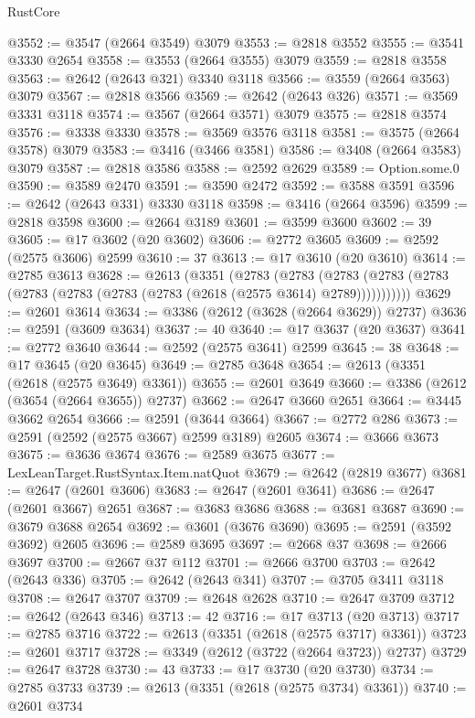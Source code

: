 \begin{lexlean}{RustCore}
\begin{coremodule}
@3552 := @3547 (@2664 @3549) @3079
@3553 := @2818 @3552
@3555 := @3541 @3330 @2654
@3558 := @3553 (@2664 @3555) @3079
@3559 := @2818 @3558
@3563 := @2642 (@2643 @321) @3340 @3118
@3566 := @3559 (@2664 @3563) @3079
@3567 := @2818 @3566
@3569 := @2642 (@2643 @326)
@3571 := @3569 @3331 @3118
@3574 := @3567 (@2664 @3571) @3079
@3575 := @2818 @3574
@3576 := @3338 @3330
@3578 := @3569 @3576 @3118
@3581 := @3575 (@2664 @3578) @3079
@3583 := @3416 (@3466 @3581)
@3586 := @3408 (@2664 @3583) @3079
@3587 := @2818 @3586
@3588 := @2592 @2629
@3589 := Option.some.{0}
@3590 := @3589 @2470
@3591 := @3590 @2472
@3592 := @3588 @3591
@3596 := @2642 (@2643 @331) @3330 @3118
@3598 := @3416 (@2664 @3596)
@3599 := @2818 @3598
@3600 := @2664 @3189
@3601 := @3599 @3600
@3602 := 39
@3605 := @17 @3602 (@20 @3602)
@3606 := @2772 @3605
@3609 := @2592 (@2575 @3606) @2599
@3610 := 37
@3613 := @17 @3610 (@20 @3610)
@3614 := @2785 @3613
@3628 := @2613
    (@3351
      (@2783
        (@2783
          (@2783 (@2783 (@2783 (@2783 (@2783 (@2783 (@2783 (@2618 (@2575 @3614) @2789)))))))))))
@3629 := @2601 @3614
@3634 := @3386 (@2612 (@3628 (@2664 @3629)) @2737)
@3636 := @2591 (@3609 @3634)
@3637 := 40
@3640 := @17 @3637 (@20 @3637)
@3641 := @2772 @3640
@3644 := @2592 (@2575 @3641) @2599
@3645 := 38
@3648 := @17 @3645 (@20 @3645)
@3649 := @2785 @3648
@3654 := @2613 (@3351 (@2618 (@2575 @3649) @3361))
@3655 := @2601 @3649
@3660 := @3386 (@2612 (@3654 (@2664 @3655)) @2737)
@3662 := @2647 @3660 @2651
@3664 := @3445 @3662 @2654
@3666 := @2591 (@3644 @3664)
@3667 := @2772 @286
@3673 := @2591 (@2592 (@2575 @3667) @2599 @3189) @2605
@3674 := @3666 @3673
@3675 := @3636 @3674
@3676 := @2589 @3675
@3677 := LexLeanTarget.RustSyntax.Item.natQuot
@3679 := @2642 (@2819 @3677)
@3681 := @2647 (@2601 @3606)
@3683 := @2647 (@2601 @3641)
@3686 := @2647 (@2601 @3667) @2651
@3687 := @3683 @3686
@3688 := @3681 @3687
@3690 := @3679 @3688 @2654
@3692 := @3601 (@3676 @3690)
@3695 := @2591 (@3592 @3692) @2605
@3696 := @2589 @3695
@3697 := @2668 @37
@3698 := @2666 @3697
@3700 := @2667 @37 @112
@3701 := @2666 @3700
@3703 := @2642 (@2643 @336)
@3705 := @2642 (@2643 @341)
@3707 := @3705 @3411 @3118
@3708 := @2647 @3707
@3709 := @2648 @2628
@3710 := @2647 @3709
@3712 := @2642 (@2643 @346)
@3713 := 42
@3716 := @17 @3713 (@20 @3713)
@3717 := @2785 @3716
@3722 := @2613 (@3351 (@2618 (@2575 @3717) @3361))
@3723 := @2601 @3717
@3728 := @3349 (@2612 (@3722 (@2664 @3723)) @2737)
@3729 := @2647 @3728
@3730 := 43
@3733 := @17 @3730 (@20 @3730)
@3734 := @2785 @3733
@3739 := @2613 (@3351 (@2618 (@2575 @3734) @3361))
@3740 := @2601 @3734

\end{coremodule}
\end{lexlean}
